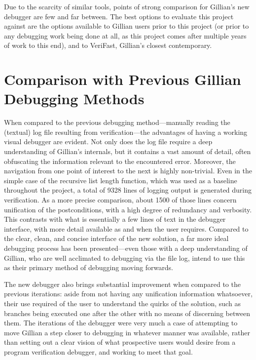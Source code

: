 Due to the scarcity of similar tools, points of strong comparison for Gillian's
new debugger are few and far between. The best options to evaluate this project
against are the options available to Gillian users prior to this project (or
prior to any debugging work being done at all, as this project comes after
multiple years of work to this end), and to VeriFast, Gillian's closest
contemporary.

\section{Comparison with Previous Gillian Debugging Methods}

When compared to the previous debugging method---manually reading the (textual)
log file resulting from verification---the advantages of having a working visual
debugger are evident. Not only does the log file require a deep understanding of
Gillian's internals, but it contains a vast amount of detail, often obfuscating
the information relevant to the encountered error. Moreover, the navigation from
one point of interest to the next is highly non-trivial. Even in the simple case
of the recursive list length function, which was used as a baseline throughout
the project, a total of 9328 lines of logging output is generated during
verification. As a more precise comparison, about 1500 of those lines concern
unification of the postconditions, with a high degree of redundancy and
verbosity. This contrasts with what is essentially a few lines of text in the
debugger interface, with more detail available as and when the user requires.
Compared to the clear, clean, and concise interface of the new solution, a far
more ideal debugging process has been presented---even those with a deep
understanding of Gillian, who are well acclimated to debugging via the file log,
intend to use this as their primary method of debugging moving forwards.


The new debugger also brings substantial improvement when compared to the
previous iterations: aside from not having any unification information
whatsoever, their use required of the user to understand the quirks of the
solution, such as branches being executed one after the other with no means of
discerning between them. The iterations of the debugger were very much a case of
attempting to move Gillian a step closer to debugging in whatever manner was
available, rather than setting out a clear vision of what prospective users
would desire from a program verification debugger, and working to meet that
goal.

